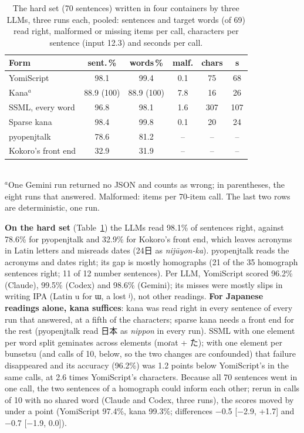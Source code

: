 \documentclass{Interspeech}
\newcommand{\ys}[1]{\mbox{\ipafont #1}}
\begin{document}
\begin{table}[t]
\centering\footnotesize
\caption{The hard set (70 sentences) written in four containers by three LLMs, three runs each, pooled: sentences and
target words (of 69) read right, malformed or missing items per call, characters per sentence (input 12.3) and seconds per call.}
\label{tab:containers}
\setlength{\tabcolsep}{2.5pt}
\begin{tabular}{lccccc}
\toprule
Form & sent.\,\% & words\,\% & malf. & chars & s\\
\midrule
YomiScript & 98.1 & 99.4 & 0.1 & 75 & 68\\
Kana$^{a}$ & 88.9 (100) & 88.9 (100) & 7.8 & 16 & 26\\
SSML, every word & 96.8 & 98.1 & 1.6 & 307 & 107\\
Sparse kana & 98.4 & 99.8 & 0.1 & 20 & 24\\
pyopenjtalk & 78.6 & 81.2 & -- & -- & --\\
Kokoro's front end & 32.9 & 31.9 & -- & -- & --\\
\bottomrule
\end{tabular}\\[2pt]
{\scriptsize $^{a}$One Gemini run returned no JSON and counts as wrong; in parentheses, the eight runs that answered. Malformed: items per 70-item call.
The last two rows are deterministic, one run.}
\end{table}

\textbf{On the hard set} (Table~\ref{tab:containers}) the LLMs read 98.1\% of sentences right, against 78.6\% for
pyopenjtalk and 32.9\% for Kokoro's front end, which leaves acronyms in Latin letters and misreads dates (24日 as \emph{nijūyon-ka}). pyopenjtalk reads the acronyms and dates right; its gap is mostly homographs (21 of the 35 homograph sentences
right; 11 of 12 number sentences). Per LLM, YomiScript scored 96.2\% (Claude), 99.5\% (Codex) and 98.6\%
(Gemini); its misses were mostly slips in writing IPA (Latin \ys{u} for \ys{ɯ}, a lost \ys{ʲ}), not other readings.
\textbf{For Japanese readings alone, kana suffices}: kana was read right in every sentence of every
run that answered, at a fifth of the characters; sparse kana needs a front end for the rest (pyopenjtalk read 日本 as
\emph{nippon} in every run). SSML with one element per word split geminates across elements (\ys{moɾat} + た); with
one element per bunsetsu (and calls of 10, below, so the two changes are confounded) that failure disappeared and
its accuracy (96.2\%) was 1.2 points below YomiScript's in the same calls, at 2.6 times YomiScript's
characters. Because all 70 sentences went in one call, the two sentences of a homograph could inform each other; rerun
in calls of 10 with no shared word (Claude and Codex, three runs), the scores moved by under a point (YomiScript
97.4\%, kana 99.3\%; differences $-$0.5 [$-$2.9, +1.7] and $-$0.7 [$-$1.9, 0.0]).
\end{document}
